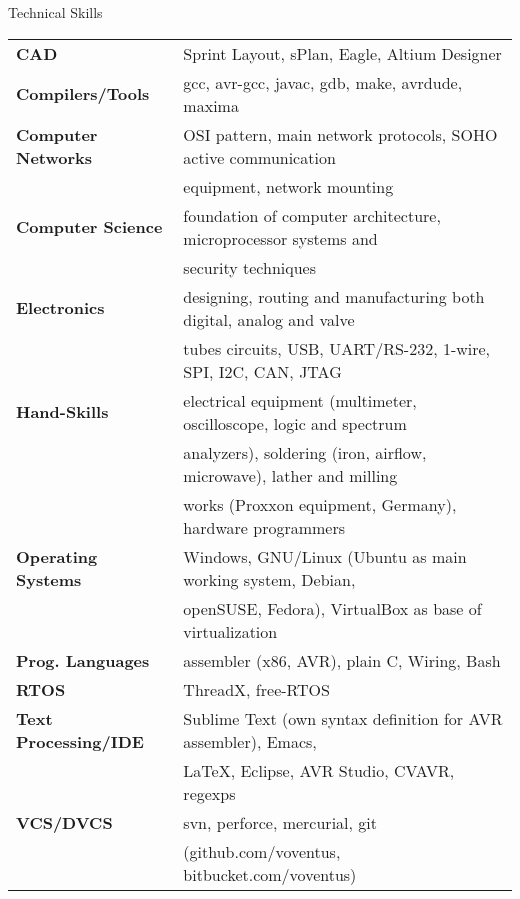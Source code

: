 \documentclass{resume}
\begin{document}
\begin{rSection}{Technical Skills}

\begin{tabular}{ @{} >{\bfseries}l @{\hspace{6ex}} l }
CAD                 & Sprint Layout, sPlan, Eagle, Altium Designer \\
Compilers/Tools     & gcc, avr-gcc, javac, gdb, make, avrdude, maxima \\
Computer Networks   & OSI pattern, main network protocols, SOHO active communication \\
                    & equipment, network mounting \\
Computer Science    & foundation of computer architecture, microprocessor systems and \\
                    & security techniques \\
Electronics         & designing, routing and manufacturing both digital, analog and valve \\
                    & tubes circuits, USB, UART/RS-232, 1-wire, SPI, I2C, CAN, JTAG \\
Hand-Skills         & electrical equipment (multimeter, oscilloscope, logic and spectrum \\
                    & analyzers), soldering (iron, airflow, microwave), lather and milling \\
                    & works (Proxxon equipment, Germany), hardware programmers \\
Operating Systems   & Windows, GNU/Linux (Ubuntu as main working system, Debian, \\
                    & openSUSE, Fedora), VirtualBox as base of virtualization \\
Prog. Languages     & assembler (x86, AVR), plain C, Wiring, Bash \\
RTOS                & ThreadX, free-RTOS \\
Text Processing/IDE & Sublime Text (own syntax definition for AVR assembler), Emacs, \\
                    & LaTeX, Eclipse, AVR Studio, CVAVR, regexps \\
VCS/DVCS            & svn, perforce, mercurial, git \\ 
                    & (github.com/voventus, bitbucket.com/voventus)
\end{tabular}

\end{rSection}

\end{document}
